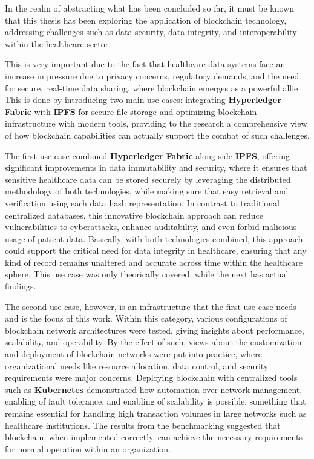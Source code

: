In the realm of abstracting what has been concluded so far, it must be known that this thesis has been exploring the application of blockchain technology, addressing challenges such as data security, data integrity, and interoperability within the healthcare sector.

This is very important due to the fact that healthcare data systems face an increase in pressure due to privacy concerns, regulatory demands, and the need for secure, real-time data sharing, where blockchain emerges as a powerful allie. This is done by introducing two main use cases: integrating \textbf{Hyperledger Fabric} with \textbf{IPFS} for secure file storage and optimizing blockchain infrastructure with modern tools, providing to the research a comprehensive view of how blockchain capabilities can actually support the combat of such challenges.

The first use case combined \textbf{Hyperledger Fabric} along side \textbf{IPFS}, offering significant improvements in data immutability and security, where it ensures that sensitive healthcare data can be stored securely by leveraging the distributed methodology of both technologies, while making sure that easy retrieval and verification using each data hash representation. In contrast to traditional centralized databases, this innovative blockchain approach can reduce vulnerabilities to cyberattacks, enhance auditability, and even forbid malicious usage of patient data. Basically, with both technologies combined, this approach could support the critical need for data integrity in healthcare, ensuring that any kind of record remains unaltered and accurate across time within the healthcare sphere. This use case was only theorically covered, while the next has actual findings.

The second use case, however, is an infrastructure that the first use case needs and is the focus of this work. Within this category, various configurations of blockchain network architectures were tested, giving insights about performance, scalability, and operability. By the effect of such, views about the customization and deployment of blockchain networks were put into practice, where organizational needs like resource allocation, data control, and security requirements were major concerns. Deploying blockchain with centralized tools such as \textbf{Kubernetes} demonstrated how automation over network management, enabling of fault tolerance, and enabling of scalability is possible, something that remains essential for handling high transaction volumes in large networks such as healthcare institutions. The results from the benchmarking suggested that blockchain, when implemented correctly, can achieve the necessary requirements for normal operation within an organization.

